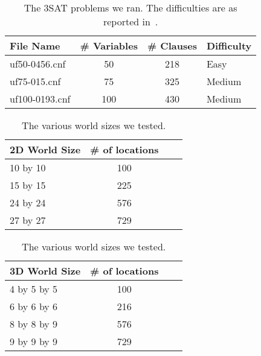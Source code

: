 \documentclass[12pt]{article}
\begin{document}
\begin{table}[tb]
\begin{center}
\begin{tabular}{lccl}
	\textbf{File Name} & \textbf{\# Variables} & \textbf{\# Clauses} & \textbf{Difficulty} \\ \hline
	uf50-0456.cnf & 50 & 218 & Easy \\
	uf75-015.cnf & 75 & 325 & Medium \\
	uf100-0193.cnf & 100 & 430 & Medium \\
\end{tabular}
\caption{The 3SAT problems we ran. The difficulties are as reported in~\cite{ellgren:2011}.}
\label{tab:problemFiles}
\end{center}
\end{table}


\begin{table}[tb]
\begin{center}
\begin{tabular}{lccl}
	\textbf{2D World Size} & \textbf{\# of locations} \\ \hline
	10 by 10 & 100 \\
	15 by 15 & 225 \\
	24 by 24 & 576 \\
	27 by 27 & 729 \\
\end{tabular}
\begin{tabular}{lccl}
	\textbf{3D World Size} & \textbf{\# of locations} \\ \hline
	4 by 5 by 5 & 100 \\
	6 by 6 by 6 & 216 \\
	8 by 8 by 9 & 576 \\
	9 by 9 by 9 & 729 \\
\end{tabular}
\caption{The various world sizes we tested.}
\label{tab:worldsizes}
\end{center}
\end{table}

\end{document}
